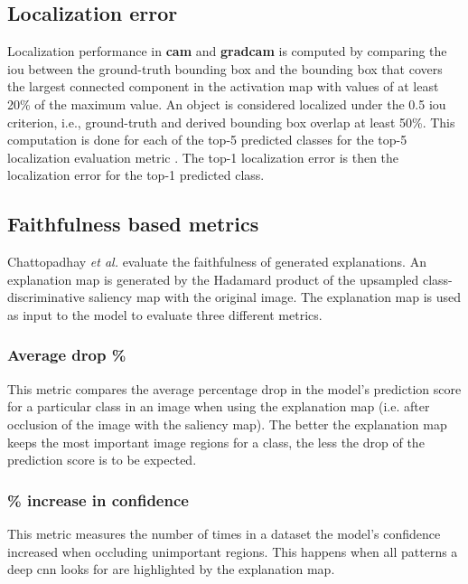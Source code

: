 \subsection{Localization error}
Localization performance in \textbf{\acrshort{cam}} \cite{zhou2016cvpr} and \textbf{\acrshort{gradcam}} \cite{selvaraju2017grad} is computed by comparing the \acrfull{iou} between the ground-truth bounding box and the bounding box that covers the largest connected component in the activation map with values of at least 20\% of the maximum value. An object is considered localized under the 0.5 \acrshort{iou} criterion, i.e., ground-truth and derived bounding box overlap at least 50\%. This computation is done for each of the top-5 predicted classes for the top-5 localization evaluation metric \cite{russakovsky2015imagenet}. The top-1 localization error is then the localization error for the top-1 predicted class.

\subsection{Faithfulness based metrics}
Chattopadhay \textit{et al.} \cite{chattopadhay2018grad} evaluate the faithfulness of generated explanations. An explanation map is generated by the Hadamard product \cite{million2007hadamard} of the upsampled class-discriminative saliency map with the original image. The explanation map is used as input to the model to evaluate three different metrics.

\subsubsection{Average drop \%}
This metric compares the average percentage drop in the model's prediction score for a particular class in an image when using the explanation map (i.e. after occlusion of the image with the saliency map). The better the explanation map keeps the most important image regions for a class, the less the drop of the prediction score is to be expected.

\subsubsection{\% increase in confidence}
This metric measures the number of times in a dataset the model's confidence increased when occluding unimportant regions. This happens when all patterns a deep \acrshort{cnn} looks for are highlighted by the explanation map.

